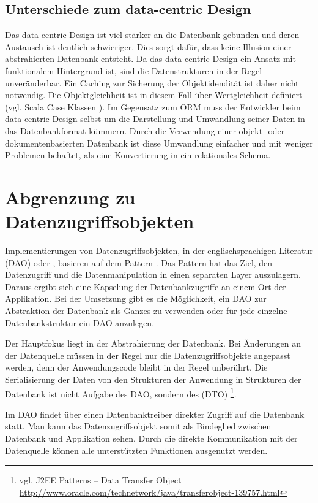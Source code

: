 \subsection{Unterschiede zum data-centric Design}
Das data-centric Design ist viel stärker an die Datenbank gebunden und deren Austausch ist deutlich schwieriger. Dies sorgt dafür, dass keine Illusion einer abstrahierten Datenbank entsteht. Da das data-centric Design ein Ansatz mit funktionalem Hintergrund ist, sind die Datenstrukturen in der Regel unveränderbar. Ein Caching zur Sicherung der Objektidendität ist daher nicht notwendig. Die Objektgleichheit ist in diesem Fall über Wertgleichheit definiert (vgl. Scala Case Klassen \cite{scala-case-class}). Im Gegensatz zum ORM muss der Entwickler beim data-centric Design selbst um die Darstellung und Umwandlung seiner Daten in das Datenbankformat kümmern. Durch die Verwendung einer objekt- oder dokumentenbasierten Datenbank ist diese Umwandlung einfacher und mit weniger Problemen behaftet, als eine Konvertierung in ein relationales Schema.

\section{Abgrenzung zu Datenzugriffsobjekten}
Implementierungen von Datenzugriffsobjekten, in der englischsprachigen Literatur  (DAO) oder , basieren auf dem  Pattern \cite{j2ee-pattern}.  Das Pattern hat das Ziel, den Datenzugriff und die Datenmanipulation in einen separaten Layer auszulagern. Daraus ergibt sich eine Kapselung der Datenbankzugriffe an einem Ort der Applikation. Bei der Umsetzung gibt es die Möglichkeit, ein DAO zur Abstraktion der Datenbank als Ganzes zu verwenden oder für jede einzelne Datenbankstruktur ein DAO anzulegen.

Der Hauptfokus liegt in der Abstrahierung der Datenbank. Bei Änderungen an der Datenquelle müssen in der Regel nur die Datenzugriffsobjekte angepasst werden, denn der Anwendungscode bleibt in der Regel unberührt. Die Serialisierung der Daten von den Strukturen der Anwendung in Strukturen der Datenbank ist nicht Aufgabe des DAO, sondern des  (DTO) \footnote{vgl. J2EE Patterns – Data Transfer Object \url{http://www.oracle.com/technetwork/java/transferobject-139757.html}}.

Im DAO findet über einen Datenbanktreiber direkter Zugriff auf die Datenbank statt. Man kann das Datenzugriffsobjekt somit als Bindeglied zwischen Datenbank und Applikation sehen. Durch die direkte Kommunikation mit der Datenquelle können alle unterstützten Funktionen ausgenutzt werden. 

